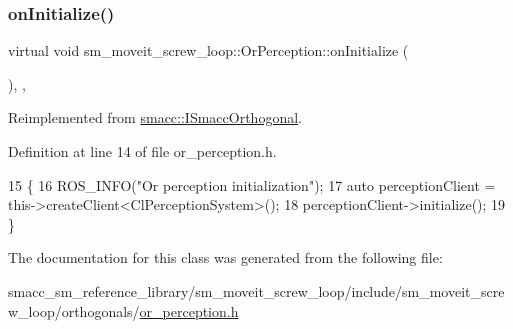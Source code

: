 \subsubsection{\texorpdfstring{on\+Initialize()}{onInitialize()}}
{\footnotesize\ttfamily virtual void sm\+\_\+moveit\+\_\+screw\+\_\+loop\+::\+Or\+Perception\+::on\+Initialize (\begin{DoxyParamCaption}{ }\end{DoxyParamCaption})\hspace{0.3cm}{\ttfamily [inline]}, {\ttfamily [override]}, {\ttfamily [virtual]}}



Reimplemented from \hyperlink{classsmacc_1_1ISmaccOrthogonal_a6bb31c620cb64dd7b8417f8705c79c7a}{smacc\+::\+I\+Smacc\+Orthogonal}.



Definition at line 14 of file or\+\_\+perception.\+h.


\begin{DoxyCode}
15     \{
16         ROS\_INFO(\textcolor{stringliteral}{"Or perception initialization"});
17         \textcolor{keyword}{auto} perceptionClient = this->createClient<ClPerceptionSystem>();
18         perceptionClient->initialize();
19     \}
\end{DoxyCode}


The documentation for this class was generated from the following file\+:\begin{DoxyCompactItemize}
\item 
smacc\+\_\+sm\+\_\+reference\+\_\+library/sm\+\_\+moveit\+\_\+screw\+\_\+loop/include/sm\+\_\+moveit\+\_\+screw\+\_\+loop/orthogonals/\hyperlink{sm__moveit__screw__loop_2include_2sm__moveit__screw__loop_2orthogonals_2or__perception_8h}{or\+\_\+perception.\+h}\end{DoxyCompactItemize}
